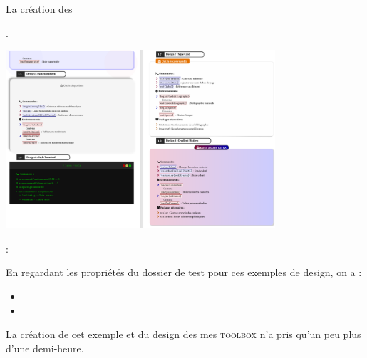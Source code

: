 \begin{bfbox}{La création des }
\begin{tcbenumerate}[2]
        \tcbitem {}. 
        \begin{center}
        \includegraphics[width=0.75\textwidth]{annexes/Example_craft_toolbox/4.png}
        \end{center}     
        
        \tcbitem {} :

        En regardant les propriétés du dossier de test pour ces exemples de design, on a :  
        \begin{itemize}[label=$\bullet$]
            \item {}
        
            \item {}
        \end{itemize}

        La création de cet exemple et du design des mes \textsc{toolbox} n'a pris qu'un peu plus d'une demi-heure.
    \end{tcbenumerate}
\end{bfbox}